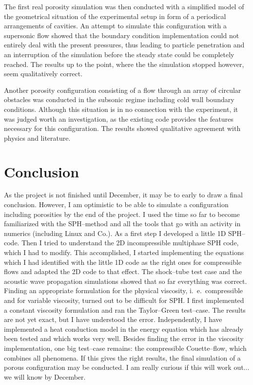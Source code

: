 \documentclass[11pt,a4paper,twoside]{report}
\begin{document}
The first real porosity simulation was then conducted with a simplified model of the geometrical situation of the experimental setup in form of a periodical arrangements of cavities. An attempt to simulate this configuration with a supersonic flow showed that the boundary condition implementation could not entirely deal with the present pressures, thus leading to particle penetration and an interruption of the simulation before the steady state could be completely reached. The results up to the point, where the the simulation stopped however, seem qualitatively correct. 

Another porosity configuration consisting of a flow through an array of circular obstacles was conducted in the subsonic regime including cold wall boundary conditions. Although this situation is in no connection with the experiment, it was judged worth an investigation, as the existing code provides the features necessary for this configuration. The results showed qualitative agreement with physics and literature.
 







 \chapter{Conclusion}
\label{sec:conclusion}










As the project is not finished until December, it may be to early to draw a final conclusion. However, I am optimistic to be able to simulate a configuration including porosities by the end of the project. I used the time so far to become familiarized with the SPH--method and all the tools that go with an activity in numerics (including Linux and Co.). As a first step I developed a little 1D SPH--code. Then I tried to understand the 2D incompressible multiphase SPH code, which I had to modify. This accomplished, I started implementing the equations which I had identified with the little 1D code as the right ones for compressible flows and adapted the 2D code to that effect. The shock--tube test case and the acoustic wave propagation simulations showed that so far everything was correct.
Finding an appropriate formulation for the physical viscosity, i.\ e.\ compressible and for variable viscosity, turned out to be difficult for SPH. I first implemented a constant viscosity formulation and ran the Taylor--Green test--case. The results are not yet exact, but I have understood the error. Independently, I have implemented a heat conduction model in the energy equation which has already been tested and which works very well.
Besides finding the error in the viscosity implementation, one big test--case remains: the compressible Couette--flow, which combines all phenomena.
If this gives the right results, the final simulation of a porous configuration may be conducted. I am really curious if this will work out... we will know by December.
\end{document}
